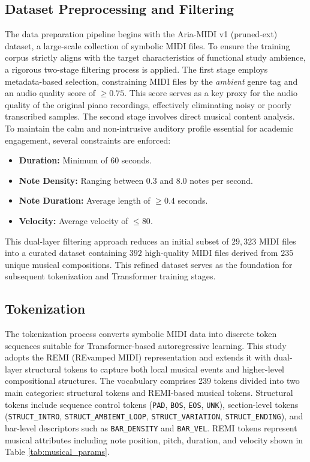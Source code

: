 \documentclass[conference,a4paper]{IEEEtran}
\begin{document}
\subsection{Dataset Preprocessing and Filtering}
The data preparation pipeline begins with the Aria-MIDI v1 (pruned-ext) dataset, a large-scale collection of symbolic MIDI files. To ensure the training corpus strictly aligns with the target characteristics of functional study ambience, a rigorous two-stage filtering process is applied. The first stage employs metadata-based selection, constraining MIDI files by the \textit{ambient} genre tag and an audio quality score of $\geq 0.75$. This score serves as a key proxy for the audio quality of the original piano recordings, effectively eliminating noisy or poorly transcribed samples. The second stage involves direct musical content analysis. To maintain the calm and non-intrusive auditory profile essential for academic engagement, several constraints are enforced:
\begin{itemize}
    \item \textbf{Duration:} Minimum of $60$ seconds.
    \item \textbf{Note Density:} Ranging between $0.3$ and $8.0$ notes per second.
    \item \textbf{Note Duration:} Average length of $\geq 0.4$ seconds.
    \item \textbf{Velocity:} Average velocity of $\leq 80$.
\end{itemize}

This dual-layer filtering approach reduces an initial subset of $29{,}323$ MIDI files into a curated dataset containing $392$ high-quality MIDI files derived from 
$235$ unique musical compositions. This refined dataset serves as the foundation for subsequent tokenization and Transformer training stages.

\subsection{Tokenization}
The tokenization process converts symbolic MIDI data into discrete token sequences suitable for Transformer-based autoregressive learning. This study adopts the REMI (REvamped MIDI) representation and extends it with dual-layer structural tokens to capture both local musical events and higher-level compositional structures. The vocabulary comprises 239 tokens divided into two main categories: structural tokens and REMI-based musical tokens. Structural tokens include sequence control tokens (\texttt{PAD}, \texttt{BOS}, \texttt{EOS}, \texttt{UNK}), section-level tokens (\texttt{STRUCT\_INTRO}, \texttt{STRUCT\_AMBIENT\_LOOP}, \texttt{STRUCT\_VARIATION}, \texttt{STRUCT\_ENDING}), and bar-level descriptors such as \texttt{BAR\_DENSITY} and \texttt{BAR\_VEL}. REMI tokens represent musical attributes including note position, pitch, duration, and velocity shown in Table \ref{tab:musical_params}.
\end{document}
